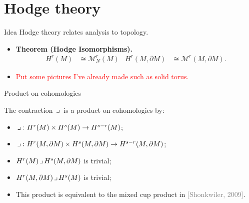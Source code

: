 \documentclass[aspectratio=169,handout]{beamer}
\makeatletter
\newcommand\boldgold[1]{\textcolor{csu_gold}{\textbf{#1}}}
\newcommand\grey[1]{\textcolor{gray}{#1}}
\let\llangle\@undefined
\let\rrangle\@undefined
\newcommand{\multivecinnerproduct}[2]{\llangle \hspace*{.5mm} #1, #2 \hspace*{.5mm} \rrangle}
\newcommand{\monogenics}{\mathcal{M}}
\newcommand{\blade}[1]{\boldsymbol{#1}}
\newcommand{\boundary}{{\partial M}}
\newcommand{\contract}{\hspace*{.5mm} \lrcorner \hspace*{.5mm}}
\makeatother
\begin{document}

\section{Hodge theory}

\begin{frame}{Idea}
\vfill
Hodge theory relates analysis to topology.
\begin{itemize}
  \pause
  \item \boldgold{Theorem (Hodge Isomorphisms).
  \begin{align*}
    H^r(M) &\cong \monogenics^r_N(M) & H^r(M,\boundary)&\cong \monogenics^r(M,\boundary).
  \end{align*}
  }
  \pause
  \item \textcolor{red}{Put some pictures I've already made such as solid torus.}
\end{itemize}
\vfill
\end{frame}

\begin{frame}{Product on cohomologies}
\vfill
\begin{proposition*}{}{}
The contraction $\contract$ is a product on cohomologies by:
\textcolor{lighter_csu_green}{
\begin{itemize}
\item $\contract \colon H^r(M)\times H^s(M) \to H^{s-r}(M)$;
\item $\contract \colon H^r(M,\boundary)\times H^s(M,\boundary) \to H^{s-r}(M,\boundary)$;
\item $H^r(M)\contract H^s(M,\boundary)$ is trivial;
\item $H^r(M,\boundary)\contract H^s(M)$ is trivial;
\end{itemize}
}
\end{proposition*}
\pause
\begin{itemize}
  \item This product is equivalent to the mixed cup product in \grey{[Shonkwiler, 2009]}.
\end{itemize}
\vfill
\end{frame}
\end{document}
